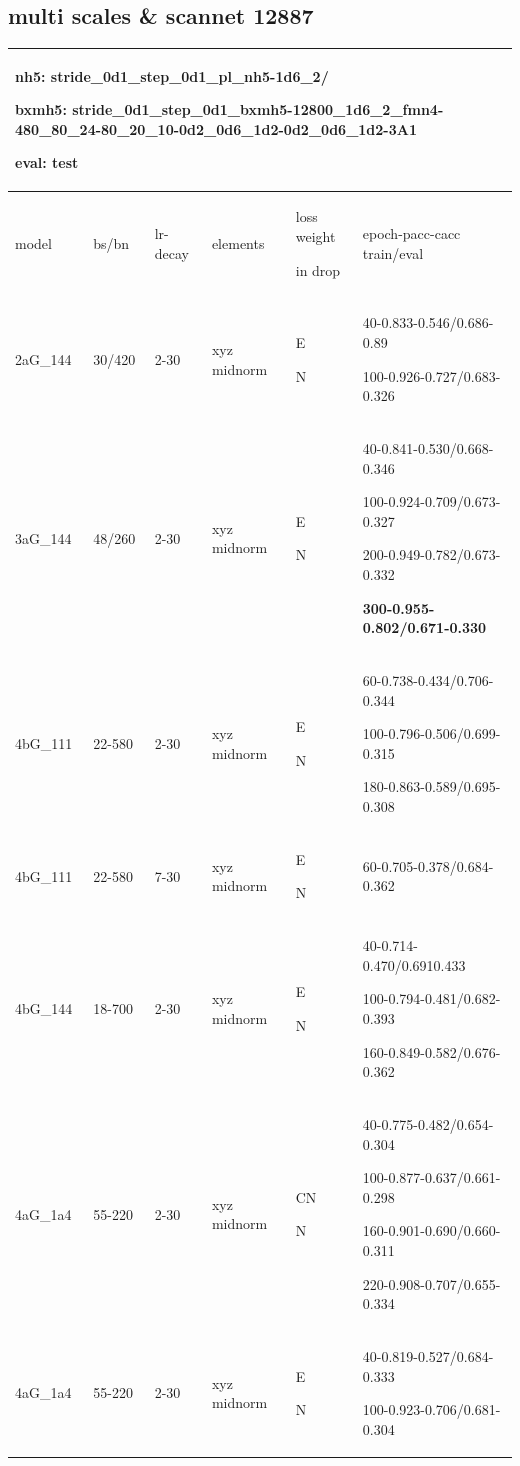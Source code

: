 \documentclass{article}
\begin{document}
\subsection{multi scales \& scannet 12887}
\begin{tabular}{|p{1.5cm}|p{1cm}|p{1cm}|p{2cm}|p{1cm}||p{5cm}| }
	\hline
	\multicolumn{6}{|p{12cm}|}{nh5: stride\_0d1\_step\_0d1\_pl\_nh5-1d6\_2/ \par bxmh5:  stride\_0d1\_step\_0d1\_bxmh5-12800\_1d6\_2\_fmn4-480\_80\_24-80\_20\_10-0d2\_0d6\_1d2-0d2\_0d6\_1d2-3A1
	\par eval: test } \\		
	\hline
	model & bs/bn& lr-decay & elements & loss weight\par in drop & epoch-pacc-cacc train/eval \\
	\hline
	2aG\_144 & 30/420 &2-30 & xyz midnorm & E\par N &40-0.833-0.546/0.686-0.89 \par 100-0.926-0.727/0.683-0.326\\
	\hline
	3aG\_144 & 48/260 &2-30 & xyz midnorm & E\par N &40-0.841-0.530/0.668-0.346 \par 100-0.924-0.709/0.673-0.327\par 200-0.949-0.782/0.673-0.332 \par \textbf{300-0.955-0.802/0.671-0.330} \\
	\hline 
	4bG\_111 & 22-580 & 2-30 & xyz midnorm & E \par N &60-0.738-0.434/0.706-0.344 \par 100-0.796-0.506/0.699-0.315\par 180-0.863-0.589/0.695-0.308 \\
	\hline
	4bG\_111 & 22-580 & 7-30 & xyz midnorm & E \par N &60-0.705-0.378/0.684-0.362 \\
	\hline
	4bG\_144 & 18-700 & 2-30 & xyz midnorm & E \par N &40-0.714-0.470/0.6910.433\par 100-0.794-0.481/0.682-0.393\par 160-0.849-0.582/0.676-0.362 \\
	\hline
	4aG\_1a4 & 55-220 & 2-30 & xyz midnorm & CN \par N &40-0.775-0.482/0.654-0.304\par 100-0.877-0.637/0.661-0.298\par 160-0.901-0.690/0.660-0.311 \par 220-0.908-0.707/0.655-0.334\\
	\hline
	4aG\_1a4 & 55-220 & 2-30 & xyz midnorm & E \par N &40-0.819-0.527/0.684-0.333\par 100-0.923-0.706/0.681-0.304\\
	

\end{tabular}
\end{document}
